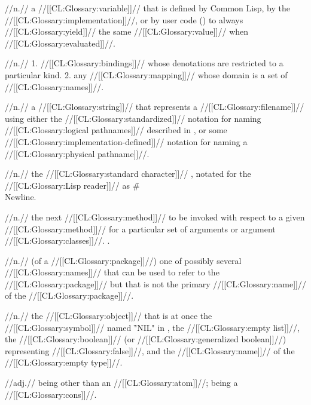  //n.// a //[[CL:Glossary:variable]]// that is defined by Common Lisp, by the //[[CL:Glossary:implementation]]//, or by user code () to always //[[CL:Glossary:yield]]// the same //[[CL:Glossary:value]]// when //[[CL:Glossary:evaluated]]//. 

 //n.// 1. //[[CL:Glossary:bindings]]// whose denotations are restricted to a particular kind.  2. any //[[CL:Glossary:mapping]]// whose domain is a set of //[[CL:Glossary:names]]//. 
 
 //n.// a //[[CL:Glossary:string]]// that represents a //[[CL:Glossary:filename]]// using either the //[[CL:Glossary:standardized]]// notation for naming //[[CL:Glossary:logical pathnames]]// described in \secref\LogPathNamestrings, or some //[[CL:Glossary:implementation-defined]]// notation for naming a //[[CL:Glossary:physical pathname]]//.

 //n.// the //[[CL:Glossary:standard character]]// \NewlineChar, notated for the //[[CL:Glossary:Lisp reader]]// as \f{\#\\Newline}.

 //n.// the next //[[CL:Glossary:method]]// to be invoked with respect to a given //[[CL:Glossary:method]]// for a particular set of arguments or argument //[[CL:Glossary:classes]]//. \Seesection\ApplyMethCombToSortedMethods.
 
 //n.// (of a //[[CL:Glossary:package]]//) one of possibly several //[[CL:Glossary:names]]// that can be used to refer to the //[[CL:Glossary:package]]// but that is not the primary //[[CL:Glossary:name]]// of the //[[CL:Glossary:package]]//.

 //n.// the //[[CL:Glossary:object]]// that is at once the //[[CL:Glossary:symbol]]// named \f{"NIL"} in , the //[[CL:Glossary:empty list]]//, the //[[CL:Glossary:boolean]]// (or //[[CL:Glossary:generalized boolean]]//) representing //[[CL:Glossary:false]]//, and the //[[CL:Glossary:name]]// of the //[[CL:Glossary:empty type]]//.
 
 //adj.// being other than an //[[CL:Glossary:atom]]//; \ie being a //[[CL:Glossary:cons]]//.

